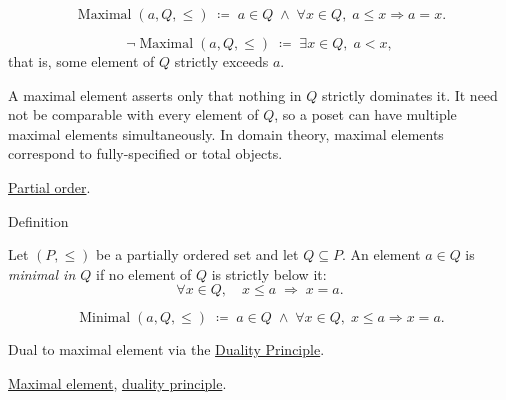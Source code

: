 \begin{remark*}
\[
\operatorname{Maximal}(a, Q, \leq)
\;\coloneqq\;
a \in Q \;\land\; \forall x \in Q,\; a \leq x \Rightarrow a = x.
\]
\end{remark*}

\begin{remark*}
\[
\neg\operatorname{Maximal}(a, Q, \leq)
\;\coloneqq\;
\exists x \in Q,\; a < x,
\]
that is, some element of $Q$ strictly exceeds $a$.
\end{remark*}

\begin{remark*}[Interpretation]
A maximal element asserts only that nothing in $Q$ strictly dominates it.
It need not be comparable with every element of $Q$, so a poset can have
multiple maximal elements simultaneously.  In domain theory, maximal
elements correspond to fully-specified or total objects.
\end{remark*}

\begin{dependencies}
\hyperref[def:lattice-order-partial-order]{Partial order}.
\end{dependencies}


\begin{definitionbox}{Definition}
\begin{definition}
\label{def:minimal-element}
Let $(P, \leq)$ be a partially ordered set and let $Q \subseteq P$.  An
element $a \in Q$ is \emph{minimal in $Q$} if no element of $Q$ is
strictly below it:
\[
\forall x \in Q, \quad x \leq a \;\Longrightarrow\; x = a.
\]
\end{definition}
\end{definitionbox}

\begin{remark*}
\[
\operatorname{Minimal}(a, Q, \leq)
\;\coloneqq\;
a \in Q \;\land\; \forall x \in Q,\; x \leq a \Rightarrow x = a.
\]
\end{remark*}

\begin{remark*}[Interpretation]
Dual to maximal element via the
\hyperref[prop:duality-principle]{Duality Principle}.
\end{remark*}

\begin{dependencies}
\hyperref[def:maximal-element]{Maximal element},
\hyperref[prop:duality-principle]{duality principle}.
\end{dependencies}

